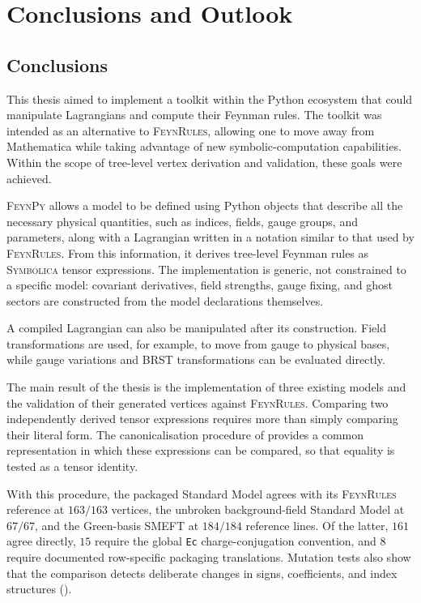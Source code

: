 \chapter{Conclusions and Outlook}
\label{ch:conclusion}

\section{Conclusions}
\label{sec:conclusion-achievements}

This thesis aimed to implement a toolkit within the Python ecosystem that could manipulate Lagrangians and compute their Feynman rules. The toolkit was intended as an alternative to \textsc{FeynRules}, allowing one to move away from Mathematica while taking advantage of new symbolic-computation capabilities. Within the scope of tree-level vertex derivation and validation, these goals were achieved.

\textsc{FeynPy} allows a model to be defined using Python objects that describe all the necessary physical quantities, such as indices, fields, gauge groups, and parameters, along with a Lagrangian written in a notation similar to that used by \textsc{FeynRules}. From this information, it derives tree-level Feynman rules as \textsc{Symbolica} tensor expressions. The implementation is generic, not constrained to a specific model: covariant derivatives, field strengths, gauge fixing, and ghost sectors are constructed from the model declarations themselves.

A compiled Lagrangian can also be manipulated after its construction. Field transformations are used, for example, to move from gauge to physical bases, while gauge variations and BRST transformations can be evaluated directly.

The main result of the thesis is the implementation of three existing models and the validation of their generated vertices against \textsc{FeynRules}. Comparing two independently derived tensor expressions requires more than simply comparing their literal form. The canonicalisation procedure of  provides a common representation in which these expressions can be compared, so that equality is tested as a tensor identity.

With this procedure, the packaged Standard Model agrees with its \textsc{FeynRules} reference at $163/163$ vertices, the unbroken background-field Standard Model at $67/67$, and the Green-basis SMEFT at $184/184$ reference lines. Of the latter, $161$ agree directly, $15$ require the global \texttt{Ec} charge-conjugation convention, and $8$ require documented row-specific packaging translations. Mutation tests also show that the comparison detects deliberate changes in signs, coefficients, and index structures ().

